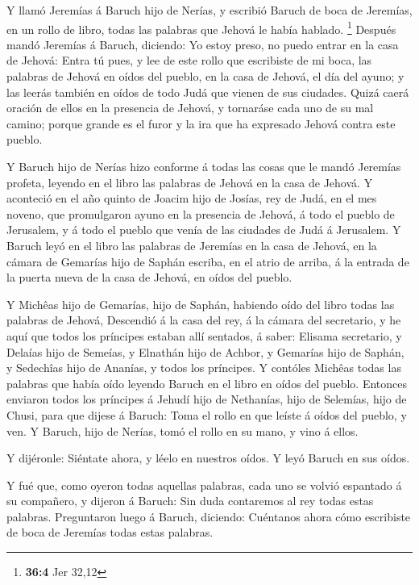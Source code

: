  Y llamó Jeremías á Baruch hijo de Nerías, y escribió Baruch
de boca de Jeremías, en un rollo de libro, todas las palabras que Jehová
le había hablado. \footnote{\textbf{36:4} Jer 32,12} 
Después mandó Jeremías á Baruch, diciendo: Yo estoy preso, no puedo
entrar en la casa de Jehová:  Entra tú pues, y lee de este
rollo que escribiste de mi boca, las palabras de Jehová en oídos del
pueblo, en la casa de Jehová, el día del ayuno; y las leerás también en
oídos de todo Judá que vienen de sus ciudades.  Quizá caerá
oración de ellos en la presencia de Jehová, y tornaráse cada uno de su
mal camino; porque grande es el furor y la ira que ha expresado Jehová
contra este pueblo.

 Y Baruch hijo de Nerías hizo conforme á todas las cosas que
le mandó Jeremías profeta, leyendo en el libro las palabras de Jehová en
la casa de Jehová.  Y aconteció en el año quinto de Joacim
hijo de Josías, rey de Judá, en el mes noveno, que promulgaron ayuno en
la presencia de Jehová, á todo el pueblo de Jerusalem, y á todo el
pueblo que venía de las ciudades de Judá á Jerusalem.  Y
Baruch leyó en el libro las palabras de Jeremías en la casa de Jehová,
en la cámara de Gemarías hijo de Saphán escriba, en el atrio de arriba,
á la entrada de la puerta nueva de la casa de Jehová, en oídos del
pueblo.

 Y Michêas hijo de Gemarías, hijo de Saphán, habiendo oído
del libro todas las palabras de Jehová,  Descendió á la
casa del rey, á la cámara del secretario, y he aquí que todos los
príncipes estaban allí sentados, á saber: Elisama secretario, y Delaías
hijo de Semeías, y Elnathán hijo de Achbor, y Gemarías hijo de Saphán, y
Sedechîas hijo de Ananías, y todos los príncipes.  Y
contóles Michêas todas las palabras que había oído leyendo Baruch en el
libro en oídos del pueblo.  Entonces enviaron todos los
príncipes á Jehudí hijo de Nethanías, hijo de Selemías, hijo de Chusi,
para que dijese á Baruch: Toma el rollo en que leíste á oídos del
pueblo, y ven. Y Baruch, hijo de Nerías, tomó el rollo en su mano, y
vino á ellos.

 Y dijéronle: Siéntate ahora, y léelo en nuestros oídos. Y
leyó Baruch en sus oídos.

 Y fué que, como oyeron todas aquellas palabras, cada uno
se volvió espantado á su compañero, y dijeron á Baruch: Sin duda
contaremos al rey todas estas palabras.  Preguntaron luego
á Baruch, diciendo: Cuéntanos ahora cómo escribiste de boca de Jeremías
todas estas palabras.

